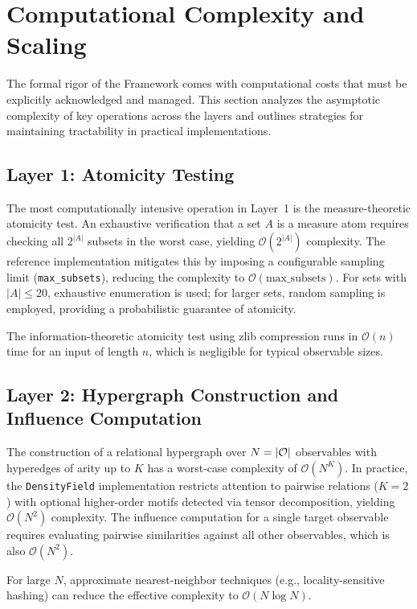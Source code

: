 \section{Computational Complexity and Scaling}
\label{sec:complexity}

The formal rigor of the \Apeiron{} Framework comes with computational costs that must be explicitly acknowledged and managed. This section analyzes the asymptotic complexity of key operations across the layers and outlines strategies for maintaining tractability in practical implementations.

\subsection{Layer 1: Atomicity Testing}

The most computationally intensive operation in Layer~1 is the measure-theoretic atomicity test. An exhaustive verification that a set $A$ is a measure atom requires checking all $2^{|A|}$ subsets in the worst case, yielding $\mathcal{O}(2^{|A|})$ complexity. The reference implementation mitigates this by imposing a configurable sampling limit (\texttt{max\_subsets}), reducing the complexity to $\mathcal{O}(\text{max\_subsets})$. For sets with $|A| \le 20$, exhaustive enumeration is used; for larger sets, random sampling is employed, providing a probabilistic guarantee of atomicity.

The information-theoretic atomicity test using zlib compression runs in $\mathcal{O}(n)$ time for an input of length $n$, which is negligible for typical observable sizes.

\subsection{Layer 2: Hypergraph Construction and Influence Computation}

The construction of a relational hypergraph over $N = |\mathcal{O}|$ observables with hyperedges of arity up to $K$ has a worst-case complexity of $\mathcal{O}(N^K)$. In practice, the \texttt{DensityField} implementation restricts attention to pairwise relations ($K=2$) with optional higher-order motifs detected via tensor decomposition, yielding $\mathcal{O}(N^2)$ complexity. The influence computation for a single target observable requires evaluating pairwise similarities against all other observables, which is also $\mathcal{O}(N^2)$.

For large $N$, approximate nearest-neighbor techniques (e.g., locality-sensitive hashing) can reduce the effective complexity to $\mathcal{O}(N \log N)$.

